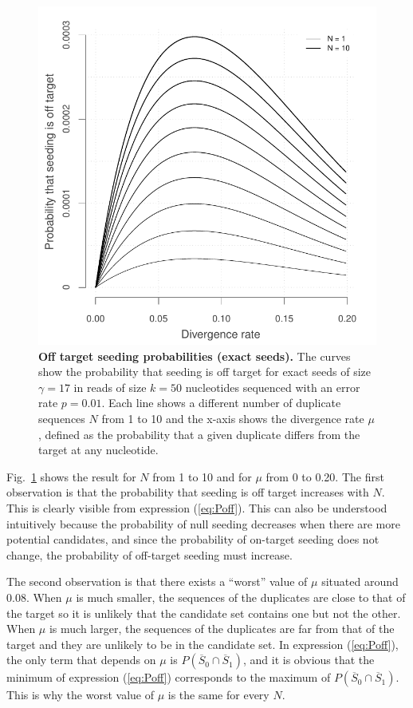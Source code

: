\documentclass{article}
\begin{document}
\begin{figure}[h]
\centering
\includegraphics[scale=0.65]{curves_exact.pdf}
\caption{\textbf{Off target seeding probabilities (exact seeds).}
The curves show the probability that seeding is off target for exact seeds
of size $\gamma=17$ in reads of size $k=50$ nucleotides sequenced with an
error rate $p=0.01$. Each line shows a different number of duplicate
sequences $N$ from 1 to 10 and the x-axis shows the divergence rate $\mu$,
defined as the probability that a given duplicate differs from the target
at any nucleotide.}
\label{fig:curves_exact}
\end{figure}

Fig.~\ref{fig:curves_exact} shows the result for $N$ from 1 to 10 and for
$\mu$ from 0 to 0.20. The first observation is that the probability that
seeding is off target increases with $N$. This is clearly visible from
expression (\ref{eq:Poff}). This can also be understood intuitively
because the probability of null seeding decreases when there are more
potential candidates, and since the probability of on-target seeding does
not change, the probability of off-target seeding must increase.

The second observation is that there exists a ``worst'' value of $\mu$
situated around 0.08. When $\mu$ is much smaller, the sequences of the
duplicates are close to that of the target so it is unlikely that the
candidate set contains one but not the other. When $\mu$ is much larger,
the sequences of the duplicates are far from that of the target and they
are unlikely to be in the candidate set. In expression (\ref{eq:Poff}),
the only term that depends on $\mu$ is $P(\overline{S}_0 \cap
\overline{S}_1)$, and it is obvious that the minimum of expression
(\ref{eq:Poff}) corresponds to the maximum of $P(\overline{S}_0 \cap
\overline{S}_1)$. This is why the worst value of $\mu$ is the same for
every $N$.
\end{document}

